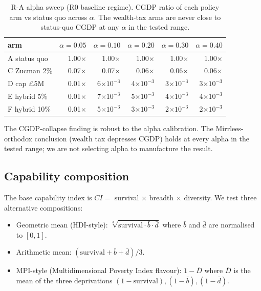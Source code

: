 \documentclass[11pt]{article}
\begin{document}
\begin{table}[h]
\centering
\small
\caption{R-A alpha sweep (R0 baseline regime). CGDP ratio of each
policy arm vs status quo across $\alpha$. The wealth-tax arms are
never close to status-quo CGDP at any $\alpha$ in the tested range.}
\label{tab:alpha-sweep}
\begin{tabular}{lrrrrr}
\toprule
arm & $\alpha=0.05$ & $\alpha=0.10$ & $\alpha=0.20$ & $\alpha=0.30$ & $\alpha=0.40$ \\
\midrule
A status quo     & 1.00$\times$    & 1.00$\times$    & 1.00$\times$ & 1.00$\times$ & 1.00$\times$ \\
C Zucman 2\%     & 0.07$\times$    & 0.07$\times$    & 0.06$\times$ & 0.06$\times$ & 0.06$\times$ \\
D cap \pounds 5M & 0.01$\times$    & 6$\times 10^{-3}$ & 4$\times 10^{-3}$ & 3$\times 10^{-3}$ & 3$\times 10^{-3}$ \\
E hybrid 5\%     & 0.01$\times$    & 7$\times 10^{-3}$ & 5$\times 10^{-3}$ & 4$\times 10^{-3}$ & 4$\times 10^{-3}$ \\
F hybrid 10\%    & 0.01$\times$    & 5$\times 10^{-3}$ & 3$\times 10^{-3}$ & 2$\times 10^{-3}$ & 2$\times 10^{-3}$ \\
\bottomrule
\end{tabular}
\end{table}

The CGDP-collapse finding is robust to the alpha calibration.  The
Mirrlees-orthodox conclusion (wealth tax depresses CGDP) holds at
every alpha in the tested range; we are not selecting alpha to
manufacture the result.

\subsection{Capability composition}

The base capability index is $CI = $ survival $\times$ breadth
$\times$ diversity.  We test three alternative compositions:

\begin{itemize}
\item Geometric mean (HDI-style): $\sqrt[3]{\text{survival} \cdot
\bar{b} \cdot \bar{d}}$ where $\bar{b}$ and $\bar{d}$ are normalised
to $[0, 1]$.
\item Arithmetic mean: $(\text{survival} + \bar{b} + \bar{d})/3$.
\item MPI-style (Multidimensional Poverty Index flavour): $1 -
\bar{D}$ where $\bar{D}$ is the mean of the three deprivations $(1 -
\text{survival}), (1 - \bar{b}), (1 - \bar{d})$.
\end{itemize}
\end{document}
